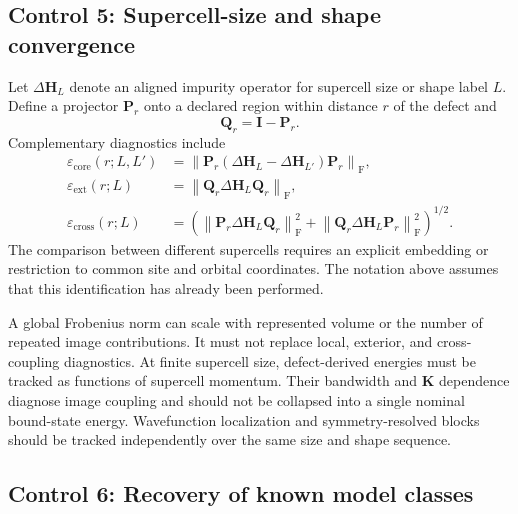 \subsection*{Control 5: Supercell-size and shape convergence}

Let $\Delta\mathbf H_L$ denote an aligned impurity operator for supercell size
or shape label $L$. Define a projector $\mathbf P_r$ onto a declared region
within distance $r$ of the defect and
\begin{equation}
    \mathbf Q_r=\mathbf I-\mathbf P_r.
\end{equation}
Complementary diagnostics include
\begin{align}
    \varepsilon_{\mathrm{core}}(r;L,L')
    &=
    \left\lVert
        \mathbf P_r
        \left(
            \Delta\mathbf H_L-
            \Delta\mathbf H_{L'}
        \right)
        \mathbf P_r
    \right\rVert_{\mathrm F},
    \\
    \varepsilon_{\mathrm{ext}}(r;L)
    &=
    \left\lVert
        \mathbf Q_r
        \Delta\mathbf H_L
        \mathbf Q_r
    \right\rVert_{\mathrm F},
    \\
    \varepsilon_{\mathrm{cross}}(r;L)
    &=
    \left(
        \left\lVert
            \mathbf P_r
            \Delta\mathbf H_L
            \mathbf Q_r
        \right\rVert_{\mathrm F}^2
        +
        \left\lVert
            \mathbf Q_r
            \Delta\mathbf H_L
            \mathbf P_r
        \right\rVert_{\mathrm F}^2
    \right)^{1/2}.
\end{align}
The comparison between different supercells requires an explicit embedding or
restriction to common site and orbital coordinates. The notation above assumes
that this identification has already been performed.

A global Frobenius norm can scale with represented volume or the number of
repeated image contributions. It must not replace local, exterior, and
cross-coupling diagnostics. At finite supercell size, defect-derived energies
must be tracked as functions of supercell momentum. Their bandwidth and
$\mathbf K$ dependence diagnose image coupling and should not be collapsed into
a single nominal bound-state energy. Wavefunction localization and
symmetry-resolved blocks should be tracked independently over the same size and
shape sequence.

\subsection*{Control 6: Recovery of known model classes}

